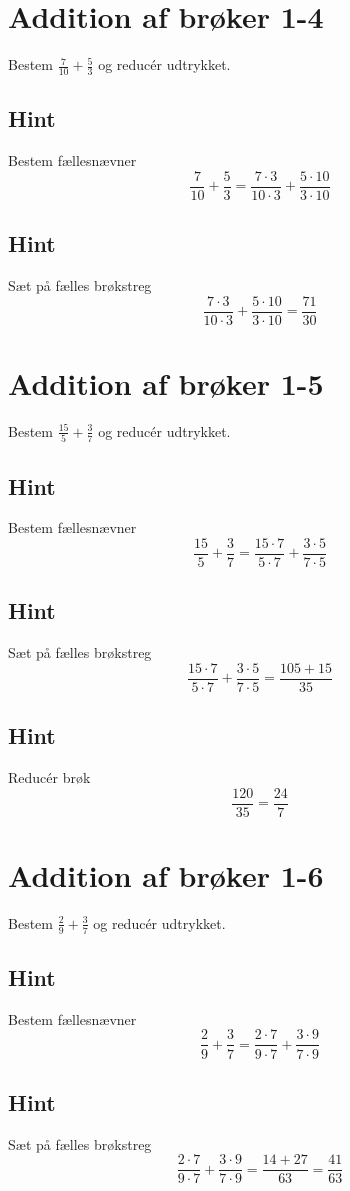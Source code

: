 \documentclass{article}
\newenvironment{exercise}[1]{\newpage\section{#1}}{}
\newcommand{\answerbox}[1]{\fbox{$#1$}}
\newcommand{\hint}{\subsection*{Hint}}
\begin{document}
	\newpage
	
	\begin{exercise}{Addition af brøker 1-4}
		
		Bestem $\frac{7}{10}+\frac{5}{3}$ og reducér udtrykket.
		
		\answerbox{\frac{71}{30}}
		
		\hint
		
		Bestem fællesnævner
		\[
		\frac{7}{10}+\frac{5}{3}  = \frac{7 \cdot 3}{10 \cdot 3}+\frac{5 \cdot 10}{3\cdot 10} 
		\]
		
		\hint
		
		Sæt på fælles brøkstreg
		\[
		\frac{7 \cdot 3}{10 \cdot 3}+\frac{5 \cdot 10}{3\cdot 10}  = \frac{71}{30} 
		\]
		

		
	\end{exercise}
	
	\newpage
	
	\begin{exercise}{Addition af brøker 1-5}
		
		Bestem $\frac{15}{5}+\frac{3}{7}$ og reducér udtrykket.
		
		\answerbox{\frac{24}{7}}
		
		\hint
		
		Bestem fællesnævner
		\[
		\frac{15}{5}+\frac{3}{7}  = \frac{15 \cdot 7}{5 \cdot 7}+\frac{3 \cdot 5}{7\cdot 5} 
		\]
		
		\hint
		
		Sæt på fælles brøkstreg
		\[
	\frac{15 \cdot 7}{5 \cdot 7}+\frac{3 \cdot 5}{7\cdot 5}  = \frac{105+15}{35} 
		\]
		
		\hint
		
		Reducér brøk
		\[
		\frac{120}{35} = \frac{24}{7}
		\]
		
	\end{exercise}
	\newpage
	
	\begin{exercise}{Addition af brøker 1-6}
		
		Bestem $\frac{2}{9}+\frac{3}{7}$ og reducér udtrykket.
		
		\answerbox{\frac{41}{63}}
		
		\hint
		
		Bestem fællesnævner
		\[
		\frac{2}{9}+\frac{3}{7}  = \frac{2 \cdot 7}{9 \cdot 7}+\frac{3 \cdot 9}{7\cdot 9} 
		\]
		
		\hint
		
		Sæt på fælles brøkstreg
		\[
		 \frac{2 \cdot 7}{9 \cdot 7}+\frac{3 \cdot 9}{7\cdot 9}   = \frac{14+27}{63}  = \frac{41}{63}
		\]

		
	\end{exercise}
	\newpage
	
\end{document}
